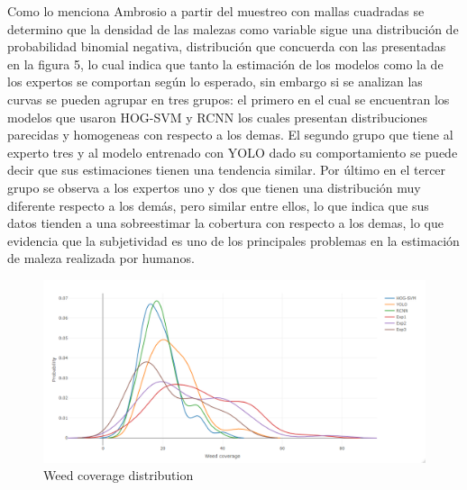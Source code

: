 \documentclass[journal,article,submit,moreauthors,pdftex]{Definitions/mdpi}
\begin{document}
Como lo menciona Ambrosio \cite{c3} a partir del muestreo con mallas cuadradas se determino que la densidad de las malezas como variable sigue una distribución de probabilidad binomial negativa, distribución que concuerda con las presentadas en la figura 5, lo cual indica que tanto la estimación de los modelos como la de los expertos se comportan según lo esperado, sin embargo si se analizan las curvas se pueden agrupar en tres grupos: el primero en el cual se encuentran los modelos que usaron HOG-SVM y RCNN los cuales presentan distribuciones parecidas y homogeneas con respecto a los demas. El segundo grupo que tiene al experto tres y al modelo entrenado con YOLO dado su comportamiento se puede decir que sus estimaciones tienen una tendencia similar. Por último en el tercer grupo se observa a los expertos uno y dos que tienen una distribución muy diferente respecto a los demás, pero similar entre ellos, lo que indica que sus datos tienden a una sobreestimar la cobertura con respecto a los demas, lo que evidencia que la subjetividad es uno de los principales problemas en la estimación de maleza realizada por humanos.

\begin{figure}[H]
    \includegraphics[scale=0.5]{weedcoveragedistribution.png}
    \caption{Weed coverage distribution}
\end{figure}
\end{document}
